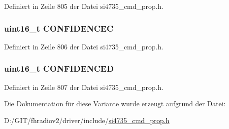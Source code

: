 Definiert in Zeile 805 der Datei si4735\+\_\+cmd\+\_\+prop.\+h.

\hypertarget{unionfm__rds__confidence_ab0a4bcb0b2e578ddbbbc4e33767a7df2}{}
\subsubsection[{C\+O\+N\+F\+I\+D\+E\+N\+C\+E\+C}]{\setlength{\rightskip}{0pt plus 5cm}uint16\+\_\+t C\+O\+N\+F\+I\+D\+E\+N\+C\+E\+C}\label{unionfm__rds__confidence_ab0a4bcb0b2e578ddbbbc4e33767a7df2}


Definiert in Zeile 806 der Datei si4735\+\_\+cmd\+\_\+prop.\+h.

\hypertarget{unionfm__rds__confidence_af81bc38f41af0228eb6a646489ad2e3a}{}
\subsubsection[{C\+O\+N\+F\+I\+D\+E\+N\+C\+E\+D}]{\setlength{\rightskip}{0pt plus 5cm}uint16\+\_\+t C\+O\+N\+F\+I\+D\+E\+N\+C\+E\+D}\label{unionfm__rds__confidence_af81bc38f41af0228eb6a646489ad2e3a}


Definiert in Zeile 807 der Datei si4735\+\_\+cmd\+\_\+prop.\+h.



Die Dokumentation für diese Variante wurde erzeugt aufgrund der Datei\+:\begin{DoxyCompactItemize}
\item 
D\+:/\+G\+I\+T/fhradiov2/driver/include/\hyperlink{si4735__cmd__prop_8h}{si4735\+\_\+cmd\+\_\+prop.\+h}\end{DoxyCompactItemize}
